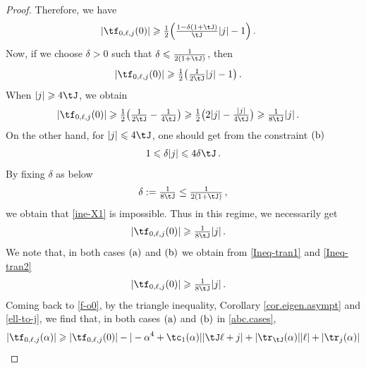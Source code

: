 \documentclass[a4paper,reqno,10pt]{article}
\begin{document}
\begin{proof}
    Therefore, we have
\begin{align*}
			|\tf_{0,\ell,j}(0)| 
			& \geqslant \tfrac12\Big(\tfrac{1-\delta(1+\tJ)}{\tJ}|j|-1\Big)\,.	
	\end{align*}   
    Now, if we choose $\delta>0$ such that $ \delta\leqslant \tfrac{1}{2(1+\tJ)}$,
    then
    \begin{align*}
			|\tf_{0,\ell,j}(0)| 
			& \geqslant \tfrac12\big(\tfrac{1}{2\tJ}|j|-1\big)\,.	
	\end{align*}  
    When $|j|\geqslant 4\tJ$,  we obtain
    \begin{align}
			|\tf_{0,\ell,j}(0)| 
			& \geqslant \tfrac12\big(\tfrac{1}{2\tJ}-\tfrac{1}{4\tJ}\big) \geqslant \tfrac12\big(2|j|-\tfrac{|j|}{4\tJ}\big) \geqslant\tfrac{1}{8\tJ}|j| \,.
	\end{align}
    On the other hand, for $|j|\leqslant 4\tJ$, one should get from the constraint $({\rm b})$
   \begin{align}\label{ine-X1}
   1\leqslant \delta |j|\leqslant 4\delta \tJ\,.
   \end{align}
  By  fixing  $\delta$ as below
   \begin{align}\label{delta-fix}
   \delta:=\tfrac{1}{8\tJ} \leq \tfrac{1}{2(1+\tJ)} \,,
   \end{align}
   we obtain that \eqref{ine-X1} is impossible. Thus in this regime, we necessarily get
   \begin{align}
			|\tf_{0,\ell,j}(0)| 
    &\geqslant \tfrac{1}{8\tJ}|j|\,. \label{Ineq-tran2}
	\end{align} 
    We note that, in both cases $({\rm a})$ and $({\rm b})$ we obtain from \eqref{Ineq-tran1} and \eqref{Ineq-tran2}
    \begin{align}
			|\tf_{0,\ell,j}(0)| 
    &\geqslant \tfrac{1}{8\tJ}|j|\,. \label{Ineq-tran4}
	\end{align}
    Coming back to \eqref{f-o0},
    by the triangle inequality, Corollary \ref{cor.eigen.asympt} and \eqref{ell-to-j}, we find that, in both cases $({\rm a})$ and $({\rm b})$ in \eqref{abc.cases},
    \begin{align}
			|\tf_{0,\ell,j}(\alpha)| &  \geqslant |\tf_{0,\ell,j}(0)|- |-\alpha^4 +\tc_{1}(\alpha)||\tJ\ell+j| +|\tr_{\tJ}(\alpha)||\ell| + |\tr_{j}(\alpha)| \\ 

\end{align}
\end{proof}
\end{document}
